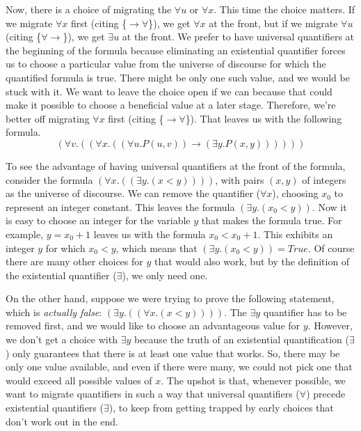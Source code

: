 {{Now, there is a choice of migrating the $\forall u$ or $\forall x$.
This time the choice matters.
If we migrate $\forall x$ first (citing \{${\rightarrow}{\forall}$\}),
we get $\forall x$ at the front,
but if we migrate $\forall u$ (citing \{${\forall}{\rightarrow}$\}),
we get $\exists u$ at the front.
We prefer to have universal quantifiers at the beginning of the formula
because eliminating an existential quantifier forces us to choose
a particular value from the universe of discourse for which the quantified
formula is true.
There might be only one such value, and we would be stuck with it.
We want to leave the choice open if we can
because that could make it possible to choose a beneficial value at
a later stage.
Therefore, we're better off migrating $\forall x$ first
(citing \{${\rightarrow}{\forall}$\}).
That leaves us with the following formula.
$$(\forall v.((\forall x.((\forall u.P(u, v)) \rightarrow (\exists y.P(x, y))))))$$

To see the advantage of having universal quantifiers at the front of the formula,
consider the formula $(\forall x.((\exists y.(x < y))))$,
with pairs $(x,y)$ of integers as the universe of discourse.
We can remove the quantifier ($\forall x$), choosing $x_0$ to
represent an integer constant.
This leaves the formula $(\exists y.(x_0 < y))$.
Now it is easy to choose an integer for the variable $y$
that makes the formula true. For example,  $y = x_0+1$
leaves us with the formula $x_0 < x_0 + 1$.
This exhibits an integer $y$ for which $x_0 < y$,
which means that $(\exists y.(x_0 < y)) = True$.
Of course there are many other choices for $y$ that would also work,
but by the definition of the existential quantifier ($\exists$), we only need one.

On the other hand, suppose we were trying to prove the following statement, which
is \emph{actually false}:
$(\exists y.((\forall x.(x < y))))$.
The $\exists y$ quantifier has to be removed first,
and we would like to choose an advantageous value for $y$.
However, we don't get a choice with $\exists y$ because
the truth of an existential quantification ($\exists$) only guarantees that
there is at least one value that works.
So, there may be only one value available, and even if there were many,
we could not pick one that would exceed all possible values of $x$.
The upshot is that, whenever possible, we want to migrate quantifiers
in such a way that universal quantifiers ($\forall$)
precede existential quantifiers ($\exists$),
to keep from getting trapped by early choices that don't work out in the end.

}}
